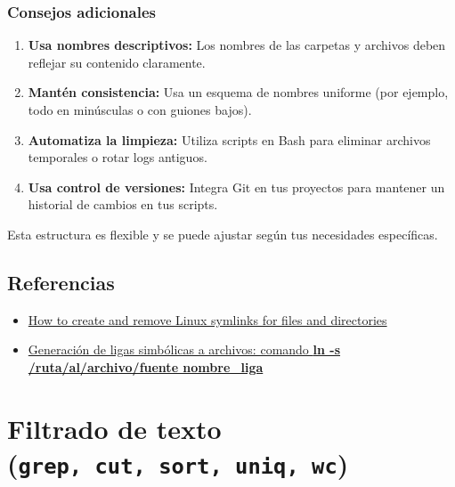\documentclass[
  spanish,
  12pt,
  letterpaper,
  DIV=11,
  numbers=noendperiod]{scrreprt}
\begin{document}
\subsection{\texorpdfstring{\textbf{Consejos
adicionales}}{Consejos adicionales}}\label{consejos-adicionales}

\begin{enumerate}
\def\labelenumi{\arabic{enumi}.}
\item
  \textbf{Usa nombres descriptivos:} Los nombres de las carpetas y
  archivos deben reflejar su contenido claramente.
\item
  \textbf{Mantén consistencia:} Usa un esquema de nombres uniforme (por
  ejemplo, todo en minúsculas o con guiones bajos).
\item
  \textbf{Automatiza la limpieza:} Utiliza scripts en Bash para eliminar
  archivos temporales o rotar logs antiguos.
\item
  \textbf{Usa control de versiones:} Integra Git en tus proyectos para
  mantener un historial de cambios en tus scripts.
\end{enumerate}

Esta estructura es flexible y se puede ajustar según tus necesidades
específicas.

\section{Referencias}\label{referencias-7}

\begin{itemize}
\item
  \href{https://www.hostinger.com/tutorials/how-to-create-symbolic-links-in-linux/?utm_campaign=Generic-Tutorials-DSA\%7CNT:Se\%7CLO:MX-EN&utm_medium=ppc&gad_source=1&gclid=Cj0KCQiAu8W6BhC-ARIsACEQoDBS5S76IeOtxlAtbyI5wPmsI72ILku8waMvXKlUo0X-ZzddJpjvKSAaAuAiEALw_wcB}{How
  to create and remove Linux symlinks for files and directories}
\item
  \href{https://vinuesa.github.io/intro2linux/index.html\#generaci\%C3\%B3n-de-ligas-simb\%C3\%B3licas-a-archivos-comando-ln--s-rutaalarchivofuente-nombre_liga}{Generación
  de ligas simbólicas a archivos: comando \textbf{ln -s
  /ruta/al/archivo/fuente nombre\_liga}}
\end{itemize}

\chapter{\texorpdfstring{Filtrado de texto
(\texttt{grep,\ cut,\ sort,\ uniq,\ wc})}{Filtrado de texto (grep, cut, sort, uniq, wc)}}\label{filtrado-de-texto-grep-cut-sort-uniq-wc}
\end{document}

